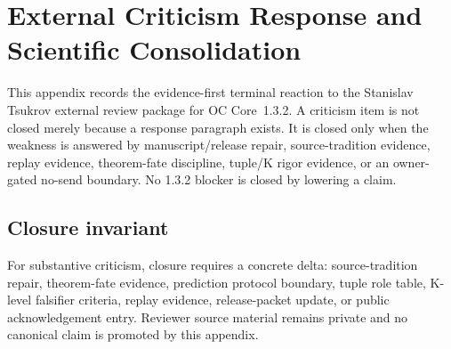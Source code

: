 \section{External Criticism Response and Scientific Consolidation}
\label{sec:oc13-external-criticism-closure}

This appendix records the evidence-first terminal reaction to the Stanislav Tsukrov external review package for OC Core~1.3.2. A criticism item is not closed merely because a response paragraph exists. It is closed only when the weakness is answered by manuscript/release repair, source-tradition evidence, replay evidence, theorem-fate discipline, tuple/K rigor evidence, or an owner-gated no-send boundary. No 1.3.2 blocker is closed by lowering a claim.

\subsection{Closure invariant}

For substantive criticism, closure requires a concrete delta: source-tradition repair, theorem-fate evidence, prediction protocol boundary, tuple role table, K-level falsifier criteria, replay evidence, release-packet update, or public acknowledgement entry. Reviewer source material remains private and no canonical claim is promoted by this appendix.

